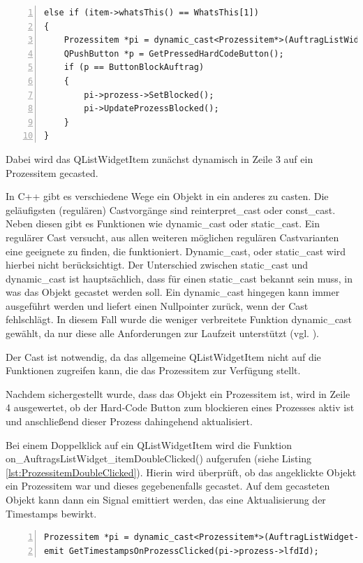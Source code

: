 \begin{lstlisting}[frame=single, breaklines=true, numbers=left, stepnumber=2, firstnumber=1, numberstyle = \tiny, caption=Funktionsblock nach Klicken auf Prozessitem ,label=lst:ProzessitemClicked]
else if (item->whatsThis() == WhatsThis[1])
{
    Prozessitem *pi = dynamic_cast<Prozessitem*>(AuftragListWidget->itemWidget(item));
    QPushButton *p = GetPressedHardCodeButton();
    if (p == ButtonBlockAuftrag)
    {
        pi->prozess->SetBlocked();
        pi->UpdateProzessBlocked();
    }
}
\end{lstlisting}

Dabei wird das QListWidgetItem zunächst dynamisch in Zeile 3 auf ein Prozessitem gecasted. 

In C++ gibt es verschiedene Wege ein Objekt in ein anderes zu casten. Die geläufigsten (regulären) Castvorgänge sind reinterpret\_cast oder const\_cast. Neben diesen gibt es Funktionen wie dynamic\_cast oder static\_cast. Ein regulärer Cast versucht, aus allen weiteren möglichen regulären Castvarianten eine geeignete zu finden, die funktioniert. Dynamic\_cast, oder static\_cast wird hierbei nicht berücksichtigt. Der Unterschied zwischen static\_cast und dynamic\_cast ist hauptsächlich, dass für einen static\_cast bekannt sein muss, in was das Objekt gecastet werden soll. Ein dynamic\_cast hingegen kann immer ausgeführt werden und liefert einen Nullpointer zurück, wenn der Cast fehlschlägt. In diesem Fall wurde die weniger verbreitete Funktion dynamic\_cast gewählt, da nur diese alle Anforderungen zur Laufzeit unterstützt (vgl. \cite{cast}). 

Der Cast ist notwendig, da das allgemeine QListWidgetItem nicht auf die Funktionen zugreifen kann, die das Prozessitem zur Verfügung stellt. 

Nachdem sichergestellt wurde, dass das Objekt ein Prozessitem ist, wird in Zeile 4 ausgewertet, ob der Hard-Code Button zum blockieren eines Prozesses aktiv ist und anschließend dieser Prozess dahingehend aktualisiert.

Bei einem Doppelklick auf ein QListWidgetItem wird die Funktion on\_Auf\-trags\-List\-Widget\_item\-Double\-Clicked() aufgerufen (siehe Listing \ref{lst:ProzessitemDoubleClicked}). Hierin wird überprüft, ob das angeklickte Objekt ein Prozessitem war und dieses gegebenenfalls gecastet. Auf dem gecasteten Objekt kann dann ein Signal emittiert werden, das eine Aktualisierung der Timestamps bewirkt. 

\begin{lstlisting}[frame=single, breaklines=true, numbers=left, stepnumber=2, firstnumber=1, numberstyle = \tiny, caption=Funktionsblock nach Doppelklick auf Prozessitem ,label=lst:ProzessitemDoubleClicked]
Prozessitem *pi = dynamic_cast<Prozessitem*>(AuftragListWidget->itemWidget(item));
emit GetTimestampsOnProzessClicked(pi->prozess->lfdId);
\end{lstlisting}


